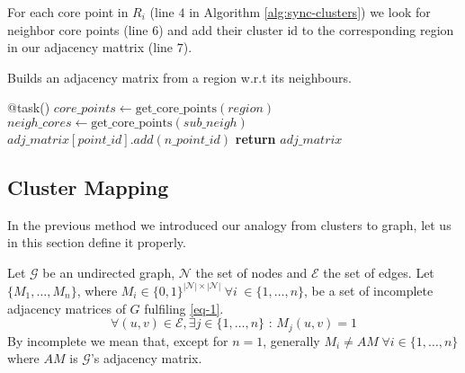 \documentclass[10pt,journal,compsoc]{IEEEtran}
\let\MYoriglatexcaption\caption
\renewcommand{\caption}[2][\relax]{\MYoriglatexcaption[#2]{#2}}
\begin{document}
For each core point in $R_i$ (line $4$ in Algorithm \ref{alg:sync-clusters}) we look for neighbor core points (line $6$) and add their cluster id to the corresponding region in our adjacency mattrix (line $7$).

\begin{algorithm}
  \caption{Builds an adjacency matrix from a region w.r.t its neighbours.\label{alg:sync-clusters}}
  \begin{algorithmic}[1]
    \State @task()
        \State $core\_points \gets \text{get\_core\_points}(region)$
            \State $neigh\_cores \gets \text{get\_core\_points}(sub\_neigh)$
                \State $adj\_matrix[point\_id].add(n\_point\_id)$
            \EndIf
        \EndFor
        \State \textbf{return} $adj\_matrix$
    \EndFunction
  \end{algorithmic}
\end{algorithm}

\subsection{Cluster Mapping} \label{subsec:cluster-mapping}
In the previous method we introduced our analogy from clusters to graph, let us in this section define it properly.

Let $\mathcal{G}$ be an undirected graph, $\mathcal{N}$ the set of nodes and $\mathcal{E}$ the set of edges. Let $\lbrace M_1, \dots, M_n \rbrace$, where $M_i \in \lbrace 0,1 \rbrace^{|\mathcal{N}|\times |\mathcal{N}|} \hspace{3pt} \forall i \hspace{3pt} \in \lbrace 1, \dots, n\rbrace $, be a set of incomplete adjacency matrices of $G$ fulfiling \ref{eq-1}.
\begin{equation} \label{eq-1}
    \forall (u, v) \in \mathcal{E}, \exists j \in \lbrace 1, \dots, n \rbrace \text{ : } M_j(u, v) = 1
\end{equation}
By incomplete we mean that, except for $n=1$, generally $M_i \neq AM \hspace{3pt} \forall i \in \lbrace 1, \dots, n \rbrace$ where $AM$ is $\mathcal{G}$'s adjacency matrix.
\end{document}
